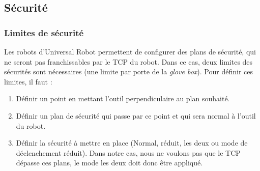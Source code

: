\subsection{Sécurité}
\subsubsection*{Limites de sécurité}
Les robots d'Universal Robot permettent de configurer des plans de sécurité, qui ne seront pas franchissables par le TCP du robot. Dans ce cas, deux limites des sécurités sont nécessaires (une limite par porte de la \textit{glove box}).
Pour définir ces limites, il faut :
\begin{enumerate}
    \item Définir un point en mettant l'outil perpendiculaire au plan souhaité.
    \item Définir un plan de sécurité qui passe par ce point et qui sera normal à l'outil du robot.
    \item Définir la sécurité à mettre en place (Normal, réduit, les deux ou mode de déclenchement réduit). Dans notre cas, nous ne voulons pas que le TCP dépasse ces plans, le mode \og{}les deux\fg{} doit donc être appliqué.
\end{enumerate}


